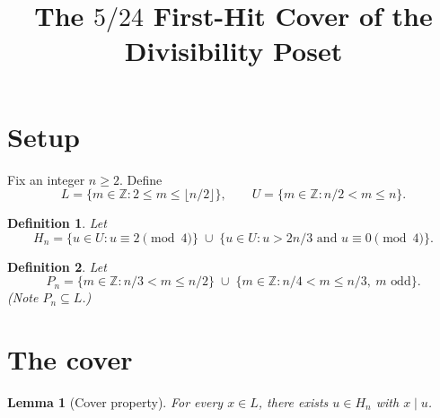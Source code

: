 \documentclass{article}
\title{The $5/24$ First-Hit Cover of the Divisibility Poset}
\date{}
\newtheorem{definition}{Definition}
\newtheorem{lemma}{Lemma}
\begin{document}
\maketitle

\section{Setup}

Fix an integer $n \ge 2$. Define
\[L = \{m \in \mathbb{Z} : 2 \le m \le \lfloor n/2 \rfloor\}, \qquad U = \{m \in \mathbb{Z} : n/2 < m \le n\}.\]

\begin{definition}
Let
\[H_n = \{u \in U : u \equiv 2 \pmod 4\} \;\cup\; \{u \in U : u > 2n/3 \text{ and } u \equiv 0 \pmod 4\}.\]
\end{definition}

\begin{definition}
Let
\[P_n = \{m \in \mathbb{Z} : n/3 < m \le n/2\} \;\cup\; \{m \in \mathbb{Z} : n/4 < m \le n/3,\ m \text{ odd}\}.\]
(Note $P_n \subseteq L$.)
\end{definition}

\section{The cover}

\begin{lemma}[Cover property]
\label{lem:cover}
For every $x \in L$, there exists $u \in H_n$ with $x \mid u$.
\end{lemma}
\end{document}
